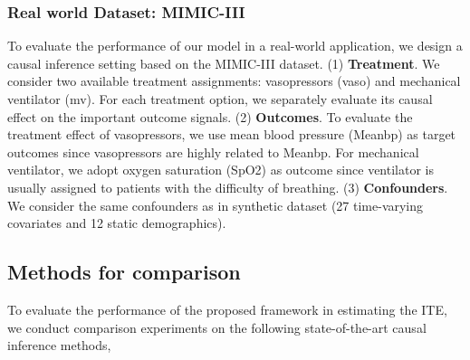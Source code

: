 \subsubsection{Real world Dataset: MIMIC-III}
To evaluate the performance of our model in a real-world application, we design a causal inference setting based on the MIMIC-III dataset. (1) \textbf{Treatment}. We consider two available treatment assignments: vasopressors (vaso) and mechanical ventilator (mv). For each treatment option, we separately evaluate its causal effect on the important outcome signals. (2) \textbf{Outcomes}. To evaluate the treatment effect of vasopressors, we use mean blood pressure (Meanbp) as target outcomes since vasopressors are highly related to Meanbp. For mechanical ventilator, we adopt oxygen saturation (SpO2) as outcome since ventilator is usually assigned to patients with the difficulty of breathing. (3) \textbf{Confounders}. We consider the same confounders as in synthetic dataset (27 time-varying covariates and 12 static demographics).

\subsection{Methods for comparison}
To evaluate the performance of the proposed framework in estimating the ITE, we conduct comparison experiments on the following state-of-the-art causal inference methods,


